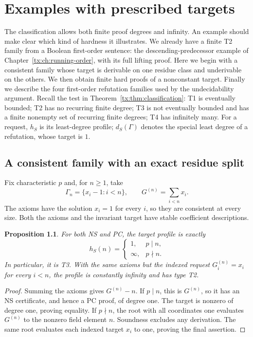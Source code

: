 \documentclass[11pt,a4paper,oneside,openany]{book}
\newtheorem{proposition}[theorem]{Proposition}
\theoremstyle{definition}\newtheorem{definition}[theorem]{Definition}
\theoremstyle{remark}\newtheorem{remark}[theorem]{Remark}
\numberwithin{equation}{chapter}
\begin{document}
\chapter{Examples with prescribed targets}\label{tx:ch:examples}
The classification allows both finite proof degrees and infinity. An
example should make clear which kind of hardness it illustrates. We
already have a finite T2 family from a Boolean first-order sentence:
the descending-predecessor example of
Chapter~\ref{tx:ch:running-order}, with its full lifting proof. Here we
begin with a consistent family whose target is derivable on one residue
class and underivable on the others. We then obtain finite hard proofs
of a nonconstant target. Finally we describe the four first-order
refutation families used by the undecidability argument.
Recall the test in Theorem~\ref{tx:thm:classification}: T1 is eventually
bounded; T2 has no recurring finite degree; T3 is not eventually bounded and has a finite
nonempty set of recurring finite degrees; T4 has infinitely many. For a request,
$h_S$ is its least-degree profile; $d_S(\Gamma)$ denotes the special
least degree of a refutation, whose target is $1$.

\section{A consistent family with an exact residue split}
Fix characteristic $p$ and, for $n\ge1$, take
\[
                  \Gamma_n=\{x_i-1:i<n\},\qquad
                  G^{(n)}=\sum_{i<n}x_i.
\]
The axioms have the solution $x_i=1$ for every $i$, so they are
consistent at every size. Both the axioms and the invariant target
have stable coefficient descriptions.

\begin{proposition}\label{tx:prop:consistent-T3}
For both NS and PC, the target profile is exactly
\[
 h_S(n)=\begin{cases}1,&p\mid n,\\\infty,&p\nmid n.\end{cases}
\]
In particular, it is T3. With the same axioms but the indexed request
$G_i^{(n)}=x_i$ for every $i<n$, the profile is constantly infinity and
has type T2.
\end{proposition}
\begin{proof}
Summing the axioms gives $G^{(n)}-n$. If $p\mid n$, this is $G^{(n)}$, so it
has an NS certificate, and hence a PC proof, of degree one. The target
is nonzero of degree one, proving equality. If $p\nmid n$, the root
with all coordinates one evaluates $G^{(n)}$ to the nonzero field element
$n$. Soundness excludes any derivation. The same root evaluates each
indexed target $x_i$ to one, proving the final assertion.
\end{proof}
\end{document}
